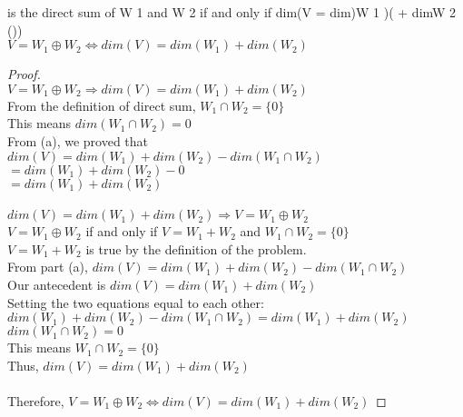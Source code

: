 \documentclass[11pt]{scrartcl}
\begin{document}
\begin{enumerate}[label=\alph*.]
{			is the direct sum of W 1 and W 2 if and only if dim(V = dim)W 1 )( + dimW 2 ())\\
			$V = W_1 \oplus W_2 \Leftrightarrow dim(V) = dim(W_1) + dim(W_2)$
			\begin{proof}
				\-\\
				$V = W_1 \oplus W_2 \Rightarrow dim(V) = dim(W_1) + dim(W_2)$\\
				From the definition of direct sum, $W_1 \cap W_2 = \{0\}$\\
				This means $dim(W_1 \cap W_2) = 0$\\
				From (a), we proved that $dim(V) = dim(W_1) + dim(W_2) - dim(W_1 \cap W_2)$\\
				$ = dim(W_1) + dim(W_2) - 0$\\
				$ = dim(W_1) + dim(W_2)$\\
				\-\\
				$dim(V) = dim(W_1) + dim(W_2) \Rightarrow V = W_1 \oplus W_2 $\\
				$V = W_1 \oplus W_2$ if and only if $V = W_1 + W_2 $ and $ W_1 \cap W_2 = \{0\}$\\
				$V = W_1 + W_2$ is true by the definition of the problem.\\
				From part (a), $dim(V) = dim(W_1) + dim(W_2) - dim(W_1 \cap W_2)$\\
				Our antecedent is $dim(V) = dim(W_1) + dim(W_2)$\\ 
				Setting the two equations equal to each other:\\
				$dim(W_1) + dim(W_2) - dim(W_1 \cap W_2) = dim(W_1) + dim(W_2)$\\ 
				$dim(W_1 \cap W_2) = 0$\\
				This means $ W_1 \cap W_2 = \{0\}$\\
				Thus, $dim(V) = dim(W_1) + dim(W_2)$ \\
				\-\\
				Therefore, $V = W_1 \oplus W_2 \Leftrightarrow dim(V) = dim(W_1) + dim(W_2)$
			\end{proof}
		}
\end{enumerate}
\end{document}
